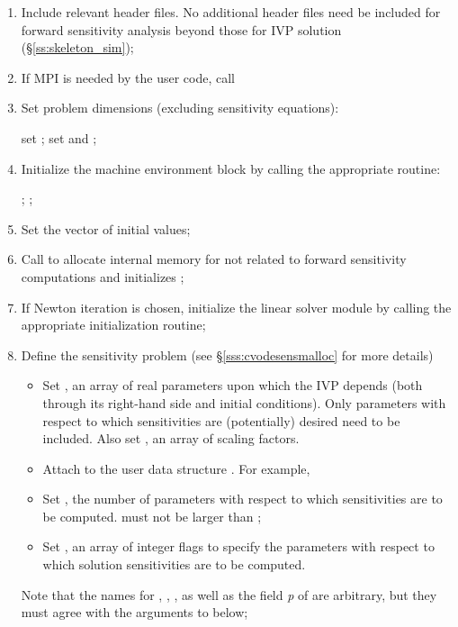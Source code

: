 \begin{enumerate}
  
\item 
  Include relevant header files. No additional header files need be
  included for forward sensitivity analysis beyond those for IVP solution 
  (\S\ref{ss:skeleton_sim});
  
\item 
  {\p} If MPI is needed by the user code, call 
  
\item
  Set problem dimensions (excluding sensitivity equations):

  {\s} set ; {\p} set  and ;
  
\item 
  Initialize the machine environment block by calling the appropriate
  {\nvector} routine:

  {\s} ; {\p} ;
  
\item
  Set the vector  of initial values;
  
\item
  Call \id{()} to allocate internal memory for 
  {\cvodes} not related to forward sensitivity computations and initializes {\cvodes};
  
\item
  If Newton iteration is chosen, initialize the linear solver module by
  calling the appropriate initialization routine;
  
\item \label{i:fwd_start}
  Define the sensitivity problem (see \S\ref{sss:cvodesensmalloc} for more details)
  \begin{itemize}
  \item 
    Set , an array of  real parameters upon which the IVP depends 
    (both through its right-hand side and initial conditions). Only parameters
    with respect to which sensitivities are (potentially) desired need to 
    be included. Also set , an array of  scaling factors.
  \item
    Attach  to the user data structure . 
    For example, 
  \item
    Set , the number of parameters with respect to which sensitivities
    are to be computed.  must not be larger than ;
  \item
    Set , an array of  integer flags to specify the parameters
     with respect to which solution sensitivities are to be computed.
  \end{itemize}
  Note that the names for , , , as well as the field
  {\em p} of  are arbitrary, but they must agree with the arguments
  to  below;


\end{enumerate}
